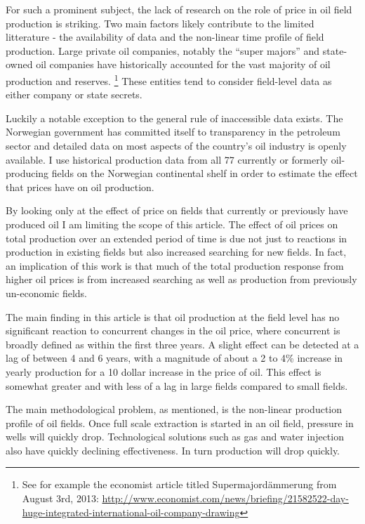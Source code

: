 \documentclass[12pt]{article}
\begin{document}

For such a prominent subject, the lack of research on the role of price in oil field production is striking. Two main factors likely contribute to the limited litterature - the availability of data and the non-linear time profile of field production.  Large private oil companies, notably the “super majors” and state-owned oil companies have historically accounted for the vast majority of oil production and reserves. \footnote{See for example the economist article titled Supermajordämmerung from August 3rd, 2013: \url{http://www.economist.com/news/briefing/21582522-day-huge-integrated-international-oil-company-drawing}} These entities tend to consider field-level data as either company or state secrets.   

Luckily a notable exception to the general rule of inaccessible data exists.  The Norwegian government has committed itself to transparency in the petroleum sector and detailed data on most aspects of the country’s oil industry is openly available.  I use historical production data from all 77 currently or formerly oil-producing fields on the Norwegian continental shelf in order to estimate the effect that prices have on oil production.  

By looking only at the effect of price on fields that currently or previously have produced oil I am limiting the scope of this article.  The effect of oil prices on total production over an extended period of time is due not just to reactions in production in existing fields but also increased searching for new fields.  In fact, an implication of this work is that much of the total production response from higher oil prices is from increased searching as well as production from previously un-economic fields.

The main finding in this article is that oil production at the field level has no significant reaction to concurrent changes in the oil price, where concurrent is broadly defined as within the first three years.  A slight effect can be detected at a lag of between 4 and 6 years, with a magnitude of about a 2 to 4\% increase in yearly production for a 10 dollar increase in the price of oil.  This effect is somewhat greater and with less of a lag in large fields compared to small fields.

The main methodological problem, as mentioned, is the non-linear production profile of oil fields.  Once full scale extraction is started in an oil field, pressure in wells will quickly drop.  Technological solutions such as gas and water injection also have quickly declining effectiveness.  In turn production will drop quickly. 
\end{document}
